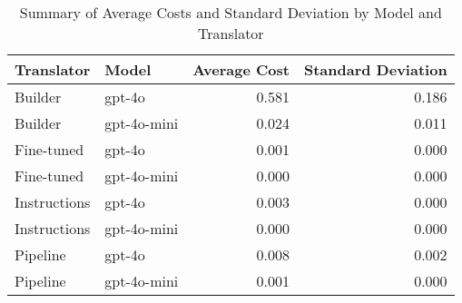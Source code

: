 \begin{table}
\caption{Summary of Average Costs and Standard Deviation by Model and Translator}
\label{tab:average_cost_summary}
\begin{tabular}{llrr}
\toprule
Translator & Model & Average Cost & Standard Deviation \\
\midrule
Builder & gpt-4o & 0.581 & 0.186 \\
Builder & gpt-4o-mini & 0.024 & 0.011 \\
Fine-tuned & gpt-4o & 0.001 & 0.000 \\
Fine-tuned & gpt-4o-mini & 0.000 & 0.000 \\
Instructions & gpt-4o & 0.003 & 0.000 \\
Instructions & gpt-4o-mini & 0.000 & 0.000 \\
Pipeline & gpt-4o & 0.008 & 0.002 \\
Pipeline & gpt-4o-mini & 0.001 & 0.000 \\
\bottomrule
\end{tabular}
\end{table}
